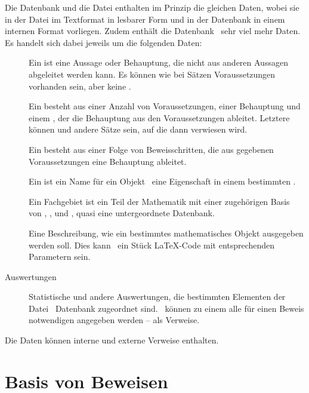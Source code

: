 Die Datenbank und die Datei enthalten im Prinzip die gleichen Daten, wobei sie in der Datei im Textformat in lesbarer Form und in der Datenbank in einem internen Format vorliegen.
Zudem enthält die Datenbank \textiAlg\ sehr viel mehr Daten. Es handelt sich dabei jeweils um die folgenden Daten:
\begin{description}
	\item[]         \label{Daten:Axiom}
	Ein  ist eine Aussage oder Behauptung, die nicht aus anderen Aussagen abgeleitet werden kann.
	Es können wie bei Sätzen Voraussetzungen vorhanden sein, aber keine .
	\item[]          \label{Daten:Satz}
	Ein  besteht aus einer Anzahl von Voraussetzungen, einer Behauptung und einem , der die Behauptung aus den Voraussetzungen ableitet.
	Letztere können  und andere Sätze sein, auf die dann verwiesen wird.
	\item[]        \label{Daten:Beweis}
	Ein  besteht aus einer Folge von Beweisschritten, die aus gegebenen Voraussetzungen eine Behauptung ableitet.
	\item[]   \label{Daten:Fachbegriff}
	Ein  ist ein Name für ein Objekt \textbzw\ eine Eigenschaft in einem bestimmten .
	\item[]    \label{Daten:Fachgebiet}
	Ein Fachgebiet ist ein Teil der Mathematik mit einer zugehörigen Basis von , ,  und , quasi eine untergeordnete Datenbank.
	\item[] \label{Daten:Ausgabeschema}
	Eine Beschreibung, wie ein bestimmtes mathematisches Objekt ausgegeben werden soll.
	Dies kann \textzB\ ein Stück \LaTeX-Code mit entsprechenden Parametern sein.
	\item[Auswertungen]             \label{Daten:Auswertung}
	Statistische und andere Auswertungen, die bestimmten Elementen der Datei \textbzw\ Datenbank zugeordnet sind.
	\textZB\ können zu einem  alle für einen Beweis notwendigen  angegeben werden -- als Verweise.
\end{description}
Die Daten können interne und externe Verweise enthalten.

\section{Basis von Beweisen}
\label{sec:BeweisBasis}

